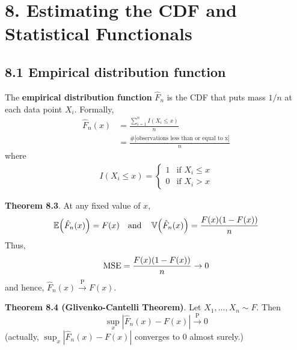 \section*{8. Estimating the CDF and Statistical Functionals}\label{estimating-the-cdf-and-statistical-functionals}

\subsection*{8.1 Empirical distribution
function}\label{empirical-distribution-function}
The \textbf{empirical distribution function} \(\hat{F}_{n}\) is the CDF
that puts mass \(1/n\) at each data point \(X_{i}\). Formally,
\begin{align*}
\hat{F}_{n}(x) & = \frac{\sum_{i=1}^{n} I\left(X_{i} \leq x \right)}{n} \\
& = \frac{\#|\text{observations less than or equal to x}|}{n}
\end{align*}
where
\begin{align*}I\left(X_{i} \leq x\right) =
    \begin{cases}
      1   & \text{if } X_{i} \leq x \\
      0   & \text{if } X_{i} > x
    \end{cases}
\end{align*}

\textbf{Theorem 8.3}. At any fixed value of \(x\),
\begin{align*}\EXP\left( \hat{F}_{n}(x) \right) = F(x)
\quad\mathrm{and}\quad 
\VAR\left( \hat{F}_{n}(x) \right) = \frac{F(x)(1 - F(x))}{n}
\end{align*}
Thus,
\[
\operatorname{\mathrm{MSE}} = \frac{F(x)(1 - F(x))}{n} \rightarrow 0
\]
and hence, \(\hat{F}_{n}(x) \xrightarrow{\textrm{P}} F(x)\).

\textbf{Theorem 8.4 (Glivenko-Cantelli Theorem)}. Let
\(X_{1}, \dots, X_{n} \sim F\). Then
\[
\sup _x |\hat{F}_{n}(x) - F(x)| \xrightarrow{\textrm{P}} 0
\]
(actually, \(\sup _x |\hat{F}_{n}(x) - F(x)|\) converges to 0 almost
surely.)

